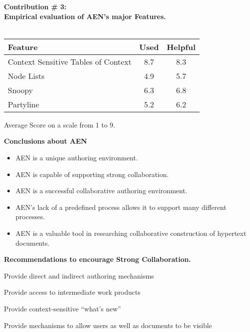 \begin{slide}\Huge 
  {\bf Contribution \# 3:\\Empirical evaluation of AEN's major Features.}
  \horizontalline\\
    \ \\\huge
  \begin{tabular}{l|c|c}
    Feature&Used&Helpful\\ \hline
    Context Sensitive Tables of Context&8.7&8.3 \\
    Node Lists&4.9&5.7\\
    Snoopy&6.3&6.8\\
    Partyline&5.2&6.2\\
  \end{tabular}
  \begin{center}
    Average Score on a scale from 1 to 9.
  \end{center}
\end{slide}

\begin{slide}\Huge 
  {\bf Conclusions about AEN}
  \horizontalline\\
  \begin{itemize}\huge
  \item AEN is a unique authoring environment.
  \item AEN is capable of supporting strong collaboration.
  \item AEN is a successful collaborative authoring environment.
  \item AEN's lack of a predefined process allows it to support many
  different processes. 
  \item AEN is a valuable tool in researching collaborative construction of
  hypertext documents.
  \end{itemize}
\end{slide}


\begin{slide}\Huge 
  {\bf Recommendations to encourage Strong Collaboration.}
  \horizontalline\\
  \begin{tenurelist}\huge
  \item Provide direct and indirect authoring mechanisms
  \item Provide access to intermediate work products
  \item Provide context-sensitive ``what's new''
  \item Provide mechanisms to allow users as well as documents to be visible
  \end{tenurelist}
\end{slide}



